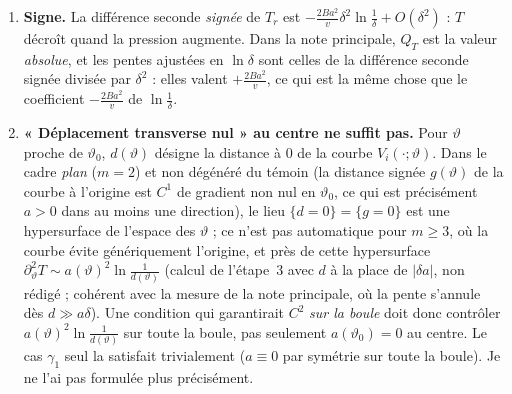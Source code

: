 \documentclass[11pt,a4paper]{article}
\theoremstyle{remark}
\newcommand{\vth}{\vartheta}
\newcommand{\dl}{\delta}
\begin{document}
\begin{enumerate}[nosep,label=(\roman*)]
\item \textbf{Signe.} La différence seconde \emph{signée} de $T_r$ est $-\frac{2Ba^2}{v}\dl^2\ln\frac1\dl+O(\dl^2)$ : $T$ décroît quand la pression augmente. Dans la note principale, $Q_T$ est la valeur \emph{absolue}, et les pentes ajustées en $\ln\dl$ sont celles de la différence seconde signée divisée par $\dl^2$ : elles valent $+\frac{2Ba^2}{v}$, ce qui est la même chose que le coefficient $-\frac{2Ba^2}v$ de $\ln\frac1\dl$.
\item \textbf{« Déplacement transverse nul » au centre ne suffit pas.} Pour $\vth$ proche de $\vth_0$, $d(\vth)$ désigne la distance à $0$ de la courbe $V_i(\cdot;\vth)$. Dans le cadre \emph{plan} ($m=2$) et non dégénéré du témoin (la distance signée $g(\vth)$ de la courbe à l'origine est $C^1$ de gradient non nul en $\vth_0$, ce qui est précisément $a>0$ dans au moins une direction), le lieu $\{d=0\}=\{g=0\}$ est une hypersurface de l'espace des $\vth$ ; ce n'est pas automatique pour $m\ge3$, où la courbe évite génériquement l'origine, et près de cette hypersurface $\partial^2_\vth T\sim a(\vth)^2\ln\frac1{d(\vth)}$ (calcul de l'étape~3 avec $d$ à la place de $\lvert\dl a\rvert$, non rédigé ; cohérent avec la mesure de la note principale, où la pente s'annule dès $d\gg a\dl$). Une condition qui garantirait $C^2$ \emph{sur la boule} doit donc contrôler $a(\vth)^2\ln\frac1{d(\vth)}$ sur toute la boule, pas seulement $a(\vth_0)=0$ au centre. Le cas $\gamma_1$ seul la satisfait trivialement ($a\equiv0$ par symétrie sur toute la boule). Je ne l'ai pas formulée plus précisément.

\end{enumerate}
\end{document}
